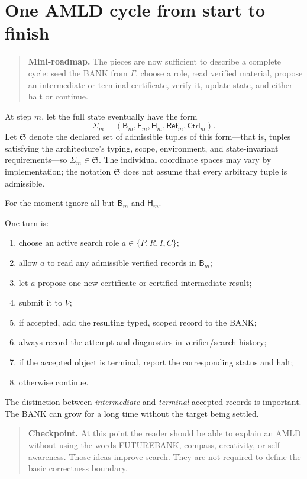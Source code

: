 \documentclass[11pt,openany]{book}
\theoremstyle{definition}
\theoremstyle{remark}
\newenvironment{miniroadmap}{\begin{quote}\small\color{deepblue}\textbf{Mini-roadmap.} }{\end{quote}}
\newenvironment{checkpoint}{\begin{quote}\small\color{black}\textbf{Checkpoint.} }{\end{quote}}
\newcommand{\Bank}{\mathsf{B}}
\newcommand{\Future}{\mathsf{F}}
\newcommand{\Hist}{\mathsf{H}}
\newcommand{\State}{\Sigma}
\newcommand{\StateSpace}{\mathfrak{S}}
\newcommand{\Refl}{\mathsf{Ref}}
\begin{document}
\chapter{One AMLD cycle from start to finish}
\begin{miniroadmap}
The pieces are now sufficient to describe a complete cycle: seed the BANK from $\Gamma$, choose a role, read verified material, propose an intermediate or terminal certificate, verify it, update state, and either halt or continue.
\end{miniroadmap}

At step $m$, let the full state eventually have the form
\[
\State_m=(\Bank_m,\Future_m,\Hist_m,\Refl_m,\mathsf{Ctrl}_m).
\]
Let $\StateSpace$ denote the declared set of admissible tuples of this form---that is, tuples satisfying the architecture's typing, scope, environment, and state-invariant requirements---so $\State_m\in\StateSpace$. The individual coordinate spaces may vary by implementation; the notation $\StateSpace$ does not assume that every arbitrary tuple is admissible.

For the moment ignore all but $\Bank_m$ and $\Hist_m$.

One turn is:
\begin{enumerate}
\item choose an active search role $a\in\{P,R,I,C\}$;
\item allow $a$ to read any admissible verified records in $\Bank_m$;
\item let $a$ propose one new certificate or certified intermediate result;
\item submit it to $V$;
\item if accepted, add the resulting typed, scoped record to the BANK;
\item always record the attempt and diagnostics in verifier/search history;
\item if the accepted object is terminal, report the corresponding status and halt;
\item otherwise continue.
\end{enumerate}

The distinction between \emph{intermediate} and \emph{terminal} accepted records is important. The BANK can grow for a long time without the target being settled.

\begin{checkpoint}
At this point the reader should be able to explain an AMLD without using the words FUTUREBANK, compass, creativity, or self-awareness. Those ideas improve search. They are not required to define the basic correctness boundary.
\end{checkpoint}
\end{document}
